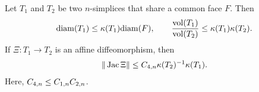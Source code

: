 \documentclass[10pt,letterpaper]{article}
\begin{document}

\begin{lemma}\label{lemma:volumecomparison}
    Let $T_1$ and $T_2$ be two $n$-simplices that share a common face $F$. Then 
    \begin{align*}
        {\operatorname{diam}}(T_1)
        \leq 
        \kappa(T_1)
        {\operatorname{diam}}(F)
        ,
        \qquad 
        \frac{ \operatorname{vol}(T_1) }{ \operatorname{vol}(T_2) }
        \leq 
        \kappa(T_1) \kappa(T_2)
        .
    \end{align*}
    If $\Xi : T_1 \rightarrow T_2$ is an affine diffeomorphism, then 
    \begin{align*}
        \| \operatorname{{\rm Jac}} \Xi \|
        \leq 
        C_{4,n}
        \kappa(T_2)^{-1} \kappa(T_1) 
        .
    \end{align*}
    Here, $C_{4,n} \leq C_{1,n} C_{2,n}$. 
\end{lemma}

    
\end{document}
